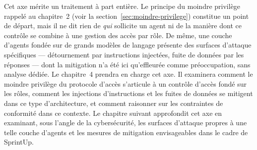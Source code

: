 Cet axe mérite un traitement à part entière. Le principe du moindre
privilège rappelé au chapitre~2 (voir la
section~\ref{sec:moindre-privilege}) constitue un point de départ, mais
il ne dit rien de \emph{qui} sollicite un agent ni de la manière dont
ce contrôle se combine à une gestion des accès par rôle. De même, une
couche d'agents fondée sur de grands modèles de langage présente des
surfaces d'attaque spécifiques — détournement par instructions
injectées, fuite de données par les réponses — dont la mitigation
n'a été ici qu'effleurée comme préoccupation, sans analyse dédiée. Le
chapitre~4 prendra en charge cet axe. Il examinera comment le moindre
privilège du protocole d'accès s'articule à un contrôle d'accès fondé
sur les rôles, comment les injections d'instructions et les fuites de
données se mitigent dans ce type d'architecture, et comment raisonner
sur les contraintes de conformité dans ce contexte. Le chapitre
suivant approfondit cet axe en examinant, sous l'angle de la
cybersécurité, les surfaces d'attaque propres à une telle couche
d'agents et les mesures de mitigation envisageables dans le cadre de
SprintUp.

\newpage
